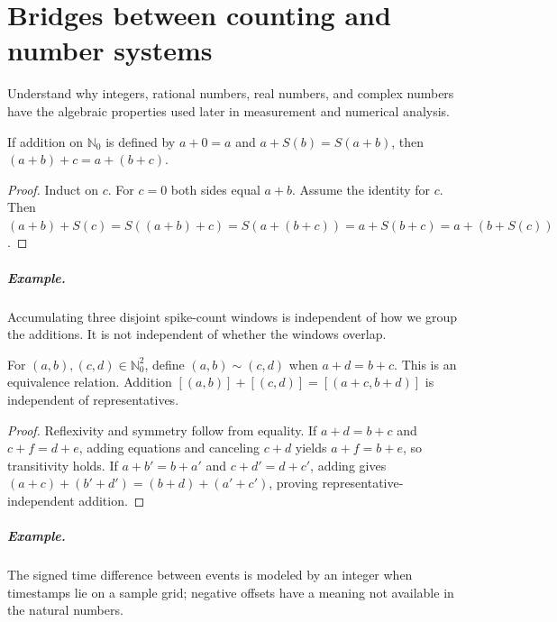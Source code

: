 \chapter{Bridges between counting and number systems}\label{ch:bridges-numbers}
\begin{readergoal}Understand why integers, rational numbers, real numbers, and complex numbers have the algebraic properties used later in measurement and numerical analysis.\end{readergoal}

\begin{proposition}If addition on $\mathbb N_0$ is defined by $a+0=a$ and $a+S(b)=S(a+b)$, then $(a+b)+c=a+(b+c)$.\end{proposition}
\begin{proof}Induct on $c$. For $c=0$ both sides equal $a+b$. Assume the identity for $c$. Then $(a+b)+S(c)=S((a+b)+c)=S(a+(b+c))=a+S(b+c)=a+(b+S(c))$.\end{proof}
\paragraph{Example.} Accumulating three disjoint spike-count windows is independent of how we group the additions. It is not independent of whether the windows overlap.



\begin{proposition}For $(a,b),(c,d)\in\mathbb N_0^2$, define $(a,b)\sim(c,d)$ when $a+d=b+c$. This is an equivalence relation. Addition $[(a,b)]+[(c,d)]=[(a+c,b+d)]$ is independent of representatives.\end{proposition}
\begin{proof}Reflexivity and symmetry follow from equality. If $a+d=b+c$ and $c+f=d+e$, adding equations and canceling $c+d$ yields $a+f=b+e$, so transitivity holds. If $a+b'=b+a'$ and $c+d'=d+c'$, adding gives $(a+c)+(b'+d')=(b+d)+(a'+c')$, proving representative-independent addition.\end{proof}
\paragraph{Example.} The signed time difference between events is modeled by an integer when timestamps lie on a sample grid; negative offsets have a meaning not available in the natural numbers.

